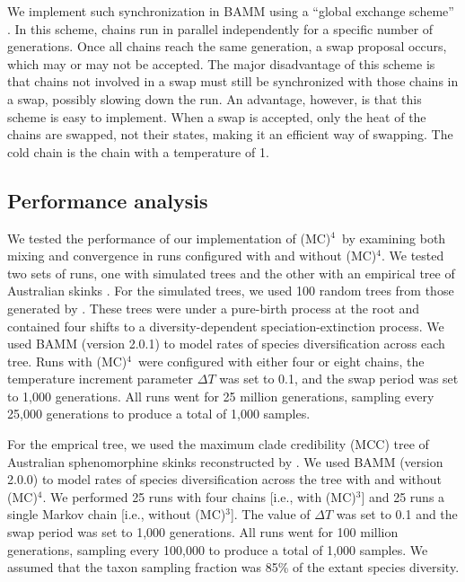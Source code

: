 \documentclass[12pt]{article}
\newcommand{\MCMCMC}{(MC)$^{3}$}
\newcommand{\MCMCMCMC}{(MC)$^{4}$}
\begin{document}
We implement such synchronization in BAMM
using a ``global exchange scheme'' \citep{alt04}.
%
In this scheme, chains run in parallel independently
for a specific number of generations.
%
Once all chains reach the same generation, a swap proposal occurs,
which may or may not be accepted.
%
The major disadvantage of this scheme
is that chains not involved in a swap
must still be synchronized with those chains in a swap,
possibly slowing down the run.
%
An advantage, however, is that this scheme is easy to implement.
%
When a swap is accepted, only the heat of the chains are swapped,
not their states, making it an efficient way of swapping.
%
The cold chain is the chain with a temperature of 1.


\subsection*{Performance analysis}

We tested the performance of our implementation of \MCMCMCMC\ 
by examining both mixing and convergence in runs
configured with and without \MCMCMCMC.
%
We tested two sets of runs, one with simulated trees
and the other with an empirical tree of Australian skinks \citep{rab14sysbio}.
%
For the simulated trees, we used 100 random trees
from those generated by \citet{rab14plos}.
%
These trees were under a pure-birth process at the root and
contained four shifts to a diversity-dependent speciation-extinction process.
%
We used BAMM (version 2.0.1) to model rates of species diversification
across each tree.
%
Runs with \MCMCMCMC\ were configured with either four or eight chains,
the temperature increment parameter $\Delta T$ was set to 0.1,
and the swap period was set to 1,000 generations.
%
All runs went for 25 million generations,
sampling every 25,000 generations to produce a total of 1,000 samples.


For the emprical tree, we used the maximum clade credibility (MCC) tree
of Australian sphenomorphine skinks reconstructed by \citet{rab14sysbio}.
%
We used BAMM (version 2.0.0) to model rates of species diversification
across the tree with and without \MCMCMCMC.
%
We performed 25 runs with four chains [i.e., with \MCMCMC]
and 25 runs a single Markov chain [i.e., without \MCMCMC].
%
The value of $\Delta T$ was set to 0.1
and the swap period was set to 1,000 generations.
%
All runs went for 100 million generations,
sampling every 100,000 to produce a total of 1,000 samples.
%
We assumed that the taxon sampling fraction was 85\%
of the extant species diversity.
\end{document}
